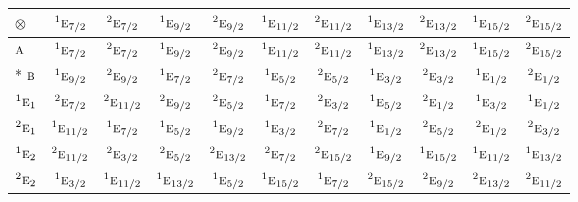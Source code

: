 \documentclass[10pt,a4paper]{article}
\numberwithin{equation}{section}
\newcommand{\irr}[1]{\text{\normalfont\scshape #1}}
\newcommand{\conjpair}[1]{{}^{#1}}
\newcommand{\irrprod}{\otimes}
\begin{document}
{\small\setlength{\tabcolsep}{3pt}\begin{longtable}{@{}lcccccccccc@{}}\toprule
$\irrprod$ & $\conjpair{1}\irr{e}_{7/2}$ & $\conjpair{2}\irr{e}_{7/2}$ & $\conjpair{1}\irr{e}_{9/2}$ & $\conjpair{2}\irr{e}_{9/2}$ & $\conjpair{1}\irr{e}_{11/2}$ & $\conjpair{2}\irr{e}_{11/2}$ & $\conjpair{1}\irr{e}_{13/2}$ & $\conjpair{2}\irr{e}_{13/2}$ & $\conjpair{1}\irr{e}_{15/2}$ & $\conjpair{2}\irr{e}_{15/2}$\\\midrule\endhead
\bottomrule\endfoot\endlastfoot
$\irr{a}$ & $\conjpair{1}\irr{e}_{7/2}$ & $\conjpair{2}\irr{e}_{7/2}$ & $\conjpair{1}\irr{e}_{9/2}$ & $\conjpair{2}\irr{e}_{9/2}$ & $\conjpair{1}\irr{e}_{11/2}$ & $\conjpair{2}\irr{e}_{11/2}$ & $\conjpair{1}\irr{e}_{13/2}$ & $\conjpair{2}\irr{e}_{13/2}$ & $\conjpair{1}\irr{e}_{15/2}$ & $\conjpair{2}\irr{e}_{15/2}$\\*
$\irr{b}$ & $\conjpair{1}\irr{e}_{9/2}$ & $\conjpair{2}\irr{e}_{9/2}$ & $\conjpair{1}\irr{e}_{7/2}$ & $\conjpair{2}\irr{e}_{7/2}$ & $\conjpair{1}\irr{e}_{5/2}$ & $\conjpair{2}\irr{e}_{5/2}$ & $\conjpair{1}\irr{e}_{3/2}$ & $\conjpair{2}\irr{e}_{3/2}$ & $\conjpair{1}\irr{e}_{1/2}$ & $\conjpair{2}\irr{e}_{1/2}$\\
$\conjpair{1}\irr{e}_{1}$ & $\conjpair{2}\irr{e}_{7/2}$ & $\conjpair{2}\irr{e}_{11/2}$ & $\conjpair{2}\irr{e}_{9/2}$ & $\conjpair{2}\irr{e}_{5/2}$ & $\conjpair{1}\irr{e}_{7/2}$ & $\conjpair{2}\irr{e}_{3/2}$ & $\conjpair{1}\irr{e}_{5/2}$ & $\conjpair{2}\irr{e}_{1/2}$ & $\conjpair{1}\irr{e}_{3/2}$ & $\conjpair{1}\irr{e}_{1/2}$\\
$\conjpair{2}\irr{e}_{1}$ & $\conjpair{1}\irr{e}_{11/2}$ & $\conjpair{1}\irr{e}_{7/2}$ & $\conjpair{1}\irr{e}_{5/2}$ & $\conjpair{1}\irr{e}_{9/2}$ & $\conjpair{1}\irr{e}_{3/2}$ & $\conjpair{2}\irr{e}_{7/2}$ & $\conjpair{1}\irr{e}_{1/2}$ & $\conjpair{2}\irr{e}_{5/2}$ & $\conjpair{2}\irr{e}_{1/2}$ & $\conjpair{2}\irr{e}_{3/2}$\\
$\conjpair{1}\irr{e}_{2}$ & $\conjpair{2}\irr{e}_{11/2}$ & $\conjpair{2}\irr{e}_{3/2}$ & $\conjpair{2}\irr{e}_{5/2}$ & $\conjpair{2}\irr{e}_{13/2}$ & $\conjpair{2}\irr{e}_{7/2}$ & $\conjpair{2}\irr{e}_{15/2}$ & $\conjpair{1}\irr{e}_{9/2}$ & $\conjpair{1}\irr{e}_{15/2}$ & $\conjpair{1}\irr{e}_{11/2}$ & $\conjpair{1}\irr{e}_{13/2}$\\
$\conjpair{2}\irr{e}_{2}$ & $\conjpair{1}\irr{e}_{3/2}$ & $\conjpair{1}\irr{e}_{11/2}$ & $\conjpair{1}\irr{e}_{13/2}$ & $\conjpair{1}\irr{e}_{5/2}$ & $\conjpair{1}\irr{e}_{15/2}$ & $\conjpair{1}\irr{e}_{7/2}$ & $\conjpair{2}\irr{e}_{15/2}$ & $\conjpair{2}\irr{e}_{9/2}$ & $\conjpair{2}\irr{e}_{13/2}$ & $\conjpair{2}\irr{e}_{11/2}$\\

\end{longtable}}
\end{document}
